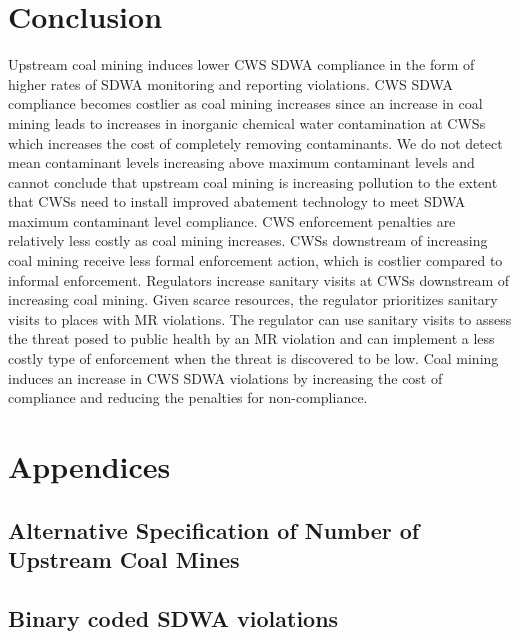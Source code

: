 \documentclass{article}
\begin{document}
\section{Conclusion}

Upstream coal mining induces lower CWS SDWA compliance in the form of higher rates of SDWA monitoring and reporting violations. CWS SDWA compliance becomes costlier as coal mining increases since an increase in coal mining leads to increases in inorganic chemical water contamination at CWSs which increases the cost of completely removing contaminants. We do not detect mean contaminant levels increasing above maximum contaminant levels and cannot conclude that upstream coal mining is increasing pollution to the extent that CWSs need to install improved abatement technology to meet SDWA maximum contaminant level compliance. CWS enforcement penalties are relatively less costly as coal mining increases. CWSs downstream of increasing coal mining receive less formal enforcement action, which is costlier compared to informal enforcement. Regulators increase sanitary visits at CWSs downstream of increasing coal mining. Given scarce resources, the regulator prioritizes sanitary visits to places with MR violations. The regulator can use sanitary visits to assess the threat posed to public health by an MR violation and can implement a less costly type of enforcement when the threat is discovered to be low. Coal mining induces an increase in CWS SDWA violations by increasing the cost of compliance and reducing the penalties for non-compliance.

\newpage

\section{Appendices}

\subsection{Alternative Specification of Number of Upstream Coal Mines}







\subsection{Binary coded SDWA violations}
\end{document}
